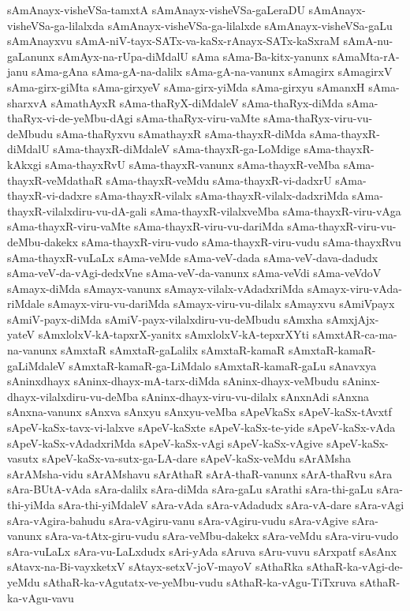 {sAmAnayx-visheVSa-tamxtA
sAmAnayx-visheVSa-gaLeraDU
sAmAnayx-visheVSa-ga-lilalxda
sAmAnayx-visheVSa-ga-lilalxde
sAmAnayx-visheVSa-gaLu
sAmAnayxvu
sAmA-niV-tayx-SATx-va-kaSx-rAnayx-SATx-kaSxraM
sAmA-nu-gaLanunx
sAmAyx-na-rUpa-diMdalU
sAma
sAma-Ba-kitx-yanunx
sAmaMta-rA-janu
sAma-gAna
sAma-gA-na-dalilx
sAma-gA-na-vanunx
sAmagirx
sAmagirxV
sAma-girx-giMta
sAma-girxyeV
sAma-girx-yiMda
sAma-girxyu
sAmanxH
sAma-sharxvA
sAmathAyxR
sAma-thaRyX-diMdaleV
sAma-thaRyx-diMda
sAma-thaRyx-vi-de-yeMbu-dAgi
sAma-thaRyx-viru-vaMte
sAma-thaRyx-viru-vu-deMbudu
sAma-thaRyxvu
sAmathayxR
sAma-thayxR-diMda
sAma-thayxR-diMdalU
sAma-thayxR-diMdaleV
sAma-thayxR-ga-LoMdige
sAma-thayxR-kAkxgi
sAma-thayxRvU
sAma-thayxR-vanunx
sAma-thayxR-veMba
sAma-thayxR-veMdathaR
sAma-thayxR-veMdu
sAma-thayxR-vi-dadxrU
sAma-thayxR-vi-dadxre
sAma-thayxR-vilalx
sAma-thayxR-vilalx-dadxriMda
sAma-thayxR-vilalxdiru-vu-dA-gali
sAma-thayxR-vilalxveMba
sAma-thayxR-viru-vAga
sAma-thayxR-viru-vaMte
sAma-thayxR-viru-vu-dariMda
sAma-thayxR-viru-vu-deMbu-dakekx
sAma-thayxR-viru-vudo
sAma-thayxR-viru-vudu
sAma-thayxRvu
sAma-thayxR-vuLaLx
sAma-veMde
sAma-veV-dada
sAma-veV-dava-dadudx
sAma-veV-da-vAgi-dedxVne
sAma-veV-da-vanunx
sAma-veVdi
sAma-veVdoV
sAmayx-diMda
sAmayx-vanunx
sAmayx-vilalx-vAdadxriMda
sAmayx-viru-vAda-riMdale
sAmayx-viru-vu-dariMda
sAmayx-viru-vu-dilalx
sAmayxvu
sAmiVpayx
sAmiV-payx-diMda
sAmiV-payx-vilalxdiru-vu-deMbudu
sAmxha
sAmxjAjx-yateV
sAmxlolxV-kA-tapxrX-yanitx
sAmxlolxV-kA-tepxrXYti
sAmxtAR-ca-ma-na-vanunx
sAmxtaR
sAmxtaR-gaLalilx
sAmxtaR-kamaR
sAmxtaR-kamaR-gaLiMdaleV
sAmxtaR-kamaR-ga-LiMdalo
sAmxtaR-kamaR-gaLu
sAnavxya
sAninxdhayx
sAninx-dhayx-mA-tarx-diMda
sAninx-dhayx-veMbudu
sAninx-dhayx-vilalxdiru-vu-deMba
sAninx-dhayx-viru-vu-dilalx
sAnxnAdi
sAnxna
sAnxna-vanunx
sAnxva
sAnxyu
sAnxyu-veMba
sApeVkaSx
sApeV-kaSx-tAvxtf
sApeV-kaSx-tavx-vi-lalxve
sApeV-kaSxte
sApeV-kaSx-te-yide
sApeV-kaSx-vAda
sApeV-kaSx-vAdadxriMda
sApeV-kaSx-vAgi
sApeV-kaSx-vAgive
sApeV-kaSx-vasutx
sApeV-kaSx-va-sutx-ga-LA-dare
sApeV-kaSx-veMdu
sArAMsha
sArAMsha-vidu
sArAMshavu
sArAthaR
sArA-thaR-vanunx
sArA-thaRvu
sAra
sAra-BUtA-vAda
sAra-dalilx
sAra-diMda
sAra-gaLu
sArathi
sAra-thi-gaLu
sAra-thi-yiMda
sAra-thi-yiMdaleV
sAra-vAda
sAra-vAdadudx
sAra-vA-dare
sAra-vAgi
sAra-vAgira-bahudu
sAra-vAgiru-vanu
sAra-vAgiru-vudu
sAra-vAgive
sAra-vanunx
sAra-va-tAtx-giru-vudu
sAra-veMbu-dakekx
sAra-veMdu
sAra-viru-vudo
sAra-vuLaLx
sAra-vu-LaLxdudx
sAri-yAda
sAruva
sAru-vuvu
sArxpatf
sAsAnx
sAtavx-na-Bi-vayxketxV
sAtayx-setxV-joV-mayoV
sAthaRka
sAthaR-ka-vAgi-de-yeMdu
sAthaR-ka-vAgutatx-ve-yeMbu-vudu
sAthaR-ka-vAgu-TiTxruva
sAthaR-ka-vAgu-vavu
}
